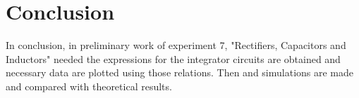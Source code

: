 \documentclass[letterpaper,12pt]{article}
\begin{document}
\section*{Conclusion}
In conclusion, in preliminary work of experiment 7, "Rectifiers, Capacitors and Inductors"  needed the expressions for the integrator circuits are obtained and necessary data are plotted using those relations. Then and simulations are made and compared with theoretical results.




\end{document}
